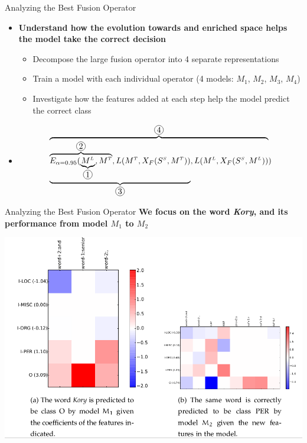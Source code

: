 \documentclass[10pt,=table]{beamer}
\newcommand*\circled[1]{\tikz[baseline=(char.base)]{
            \node[shape=circle,draw,inner sep=1pt] (char) {#1};}}
\newcommand\mlex{M^{\scriptscriptstyle L}}
\newcommand\mstd{M^{\scriptscriptstyle T}}
\newcommand\ssyn{S^{\scriptscriptstyle S}}
\begin{document}
\begin{frame}{Analyzing the Best Fusion Operator}
\begin{itemize}[<+- | alert@+>]
\item  \textbf{Understand how the evolution towards and enriched space helps the model take the correct decision}
\begin{itemize}
\item Decompose the large fusion operator into 4 separate representations
\item Train a model with each individual operator (4 models: $M_1$, $M_2$, $M_3$, $M_4$)
\item Investigate how the features added at each step help the model predict the correct class
\end{itemize}
\item[] \begin{equation*}
\overbrace{\underbrace{\overbrace{E_{\alpha=0.95}(\underbrace{\mlex}_{\circled{1}},\mstd}^{\circled{2}},L(\mstd, X_F(\ssyn, \mstd))}_{\circled{3}}, L(\mlex, X_F(\ssyn, \mlex))}^{\circled{4}})
\end{equation*}

\end{itemize}


\end{frame}


\begin{frame}{Analyzing the Best Fusion Operator}
\large \textbf{We focus on the word \textit{Kory}, and its performance from model $M_1$ to $M_2$}
\begin{center}
\includegraphics[width=0.6\linewidth]{image2/Chapitre4/fanal1.png}
\end{center}
\end{frame}
\end{document}
